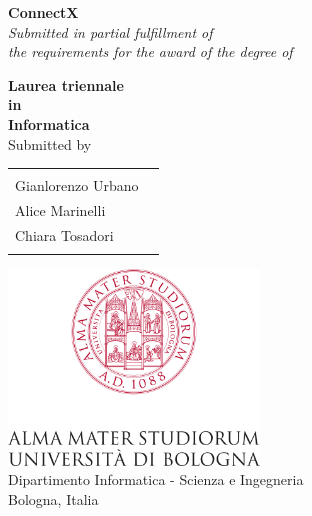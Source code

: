 \begin{titlepage}

\begin{center}

\Large \textbf {ConnectX}\\[0.5in]

       \small \emph{Submitted in partial fulfillment of\\
        the requirements for the award of the degree of}
        \vspace{.2in}

       {\bf Laurea triennale \\in\\ Informatica}\\[0.5in]

\normalsize Submitted by \\
\begin{table}[h]
\centering
\begin{tabular}{lr}\hline \\
Gianlorenzo Urbano \\
Alice Marinelli \\ 
Chiara Tosadori \\ \\ \hline 
\end{tabular}
\end{table}

\vfill

\includegraphics[width=0.5\textwidth]{./images/alma}\\[0.1in]
\Large{Dipartimento Informatica - Scienza e Ingegneria}\\
\normalsize
Bologna, Italia \\
\vspace{0.2cm}

\end{center}

\end{titlepage}
